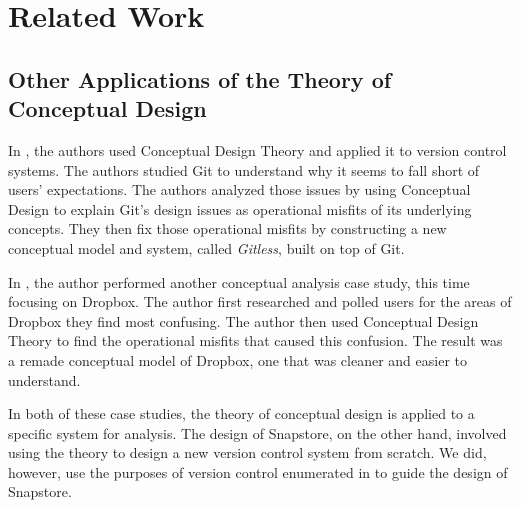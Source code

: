\chapter{Related Work}

\section{Other Applications of the Theory of Conceptual Design}



In \cite{RossoJackson}, the authors used Conceptual Design Theory and applied it to version control systems. The authors studied Git to understand why it seems to fall short of users' expectations. The authors analyzed those issues by using Conceptual Design to explain Git's design issues as operational misfits of its underlying concepts. They then fix those operational misfits by constructing a new conceptual model and system, called \textit{Gitless}, built on top of Git.

In \cite{Zhang}, the author performed another conceptual analysis case study, this time focusing on Dropbox. The author first researched and polled users for the areas of Dropbox they find most confusing. The author then used Conceptual Design Theory to find the operational misfits that caused this confusion. The result was a remade conceptual model of Dropbox, one that was cleaner and easier to understand.

In both of these case studies, the theory of conceptual design is applied to a specific system for analysis. The design of Snapstore, on the other hand, involved using the theory to design a new version control system from scratch. We did, however, use the purposes of version control enumerated in \cite{RossoJackson} to guide the design of Snapstore.


